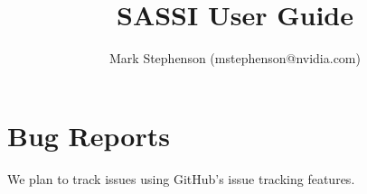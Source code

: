 \documentclass{article}
\title{SASSI User Guide}
\author{Mark Stephenson (mstephenson@nvidia.com)}
\begin{document}
\maketitle

\tableofcontents
\newpage
\listoffigures
\newpage
\listoftables
\newpage
{}















\section{Bug Reports}

We plan to track issues using GitHub's issue tracking features.
\end{document}
